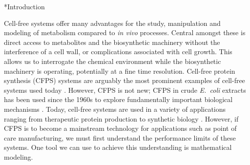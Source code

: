 \documentclass[12pt]{article}
\makeatletter
\renewcommand\section{\@startsection
	{subsection}{2}{0mm}
	{-0.2in}
	{0.05\baselineskip}
	{\normalfont\large\bfseries}}
\makeatother
\begin{document}
\linenumbers


\section*{Introduction}

Cell-free systems offer many advantages for the study, manipulation and modeling of metabolism compared to \textit{in vivo} processes.
Central amongst these is direct access to metabolites and the biosynthetic machinery without the interference of a cell wall, or complications associated with cell growth.
This allows us to interrogate the chemical environment while the biosynthetic machinery is operating, potentially at a fine time resolution.
Cell-free protein synthesis (CFPS) systems are arguably the most prominent examples of cell-free systems used today \citep{Jewett:2008aa}.
However, CFPS is not new; CFPS in crude \textit{E.~coli} extracts has been used since the 1960s to explore fundamentally important biological mechanisms \citep{MATTHAEI:1961aa,NIRENBERG:1961aa}.
Today, cell-free systems are used in a variety of applications ranging from therapeutic protein production \citep{Lu:2014aa} to synthetic biology \citep{Hodgman:2012aa,Pardee:2016aa}.
However, if CFPS is to become a mainstream technology for applications such as point of care manufacturing, we must first understand the performance limits of these systems.
One tool we can use to achieve this understanding is mathematical modeling.
\end{document}
